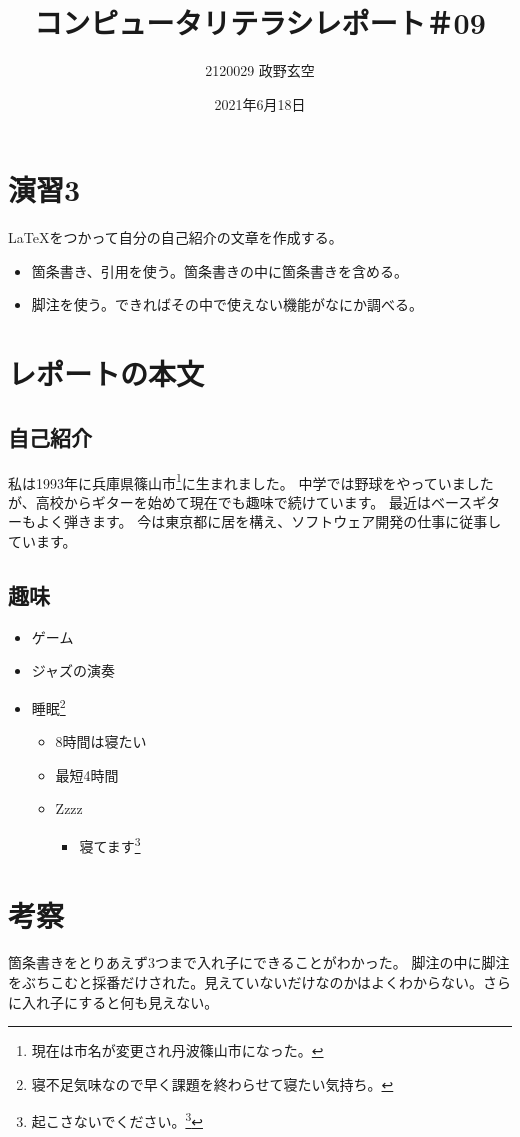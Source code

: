 \documentclass[11pt,a4j]{jarticle}
\title{コンピュータリテラシレポート＃09}
\author{2120029 政野玄空}
\date{2021年6月18日}
\begin{document}
\maketitle


\section{演習3}
LaTeXをつかって自分の自己紹介の文章を作成する。
\begin{itemize}
\item 箇条書き、引用を使う。箇条書きの中に箇条書きを含める。
\item 脚注を使う。できればその中で使えない機能がなにか調べる。
\end{itemize}
\section{レポートの本文}
\subsection{自己紹介}

私は1993年に兵庫県篠山市\footnote{現在は市名が変更され丹波篠山市になった。}に生まれました。
中学では野球をやっていましたが、高校からギターを始めて現在でも趣味で続けています。
最近はベースギターもよく弾きます。
今は東京都に居を構え、ソフトウェア開発の仕事に従事しています。

\subsection{趣味}
\begin{itemize}
\item ゲーム
\item ジャズの演奏
\item 睡眠\footnote{寝不足気味なので早く課題を終わらせて寝たい気持ち。}
\begin{itemize}
\item 8時間は寝たい
\item 最短4時間
\item Zzzz
\begin{itemize}
\item 寝てます\footnote{起こさないでください。\footnote{起きません。\footnote{起きません。}}}
\end{itemize}
\end{itemize}
\end{itemize}



\section{考察}
箇条書きをとりあえず3つまで入れ子にできることがわかった。
脚注の中に脚注をぶちこむと採番だけされた。見えていないだけなのかはよくわからない。さらに入れ子にすると何も見えない。
\end{document}
